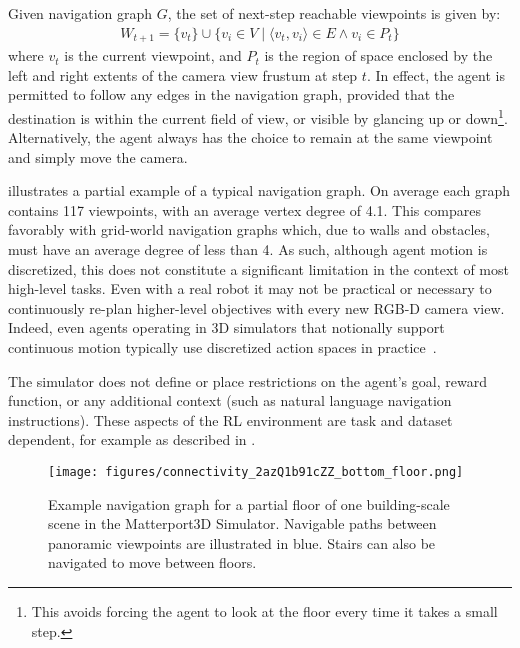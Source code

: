 \documentclass[10pt,twocolumn,letterpaper]{article}
\begin{document}
Given navigation graph $G$, the set of next-step reachable viewpoints is given by: 
\vspace{-2pt}
\begin{align}
\label{eq:reachable}
W_{t+1} = \big\{ v_t \big\} \cup \big\{v_i \in V \mid \langle v_{t},v_i \rangle \in E \land v_i \in P_t \big\}
\end{align}
\noindent
where $v_t$ is the current viewpoint, and $P_t$ is the region of space enclosed by the left and right extents of the camera view frustum at step $t$. In effect, the agent is permitted to follow any edges in the navigation graph, provided that the destination is within the current field of view, or visible by glancing up or down\footnote{This avoids forcing the agent to look at the floor every time it takes a small step.}. Alternatively, the agent always has the choice to remain at the same viewpoint and simply move the camera. 

 illustrates a partial example of a typical navigation graph. On average each graph contains 117 viewpoints, with an average vertex degree of 4.1. This compares favorably with grid-world navigation graphs which, due to walls and obstacles, must have an average degree of less than 4. As such, although agent motion is discretized, this does not constitute a significant limitation in the context of most high-level tasks. Even with a real robot it may not be practical or necessary to continuously re-plan higher-level objectives with every new RGB-D camera view. Indeed, even agents operating in 3D simulators that notionally support continuous motion typically use discretized action spaces in practice~\cite{zhu2017icra, embodiedqa,iqa,savva2017minos}.

The simulator does not define or place restrictions on the agent's goal, reward function, or any additional context (such as natural language navigation instructions). These aspects of the RL environment are task and dataset dependent, for example as described in .

\begin{figure}[t]
	\begin{center}
		\texttt{[image: figures/connectivity\_2azQ1b91cZZ\_bottom\_floor.png]}
	\end{center}
	\caption{Example navigation graph for a partial floor of one building-scale scene in the Matterport3D Simulator. Navigable paths between panoramic viewpoints are illustrated in blue. Stairs can also be navigated to move between floors.}
	\label{fig:connectivity}
\end{figure}
\end{document}
